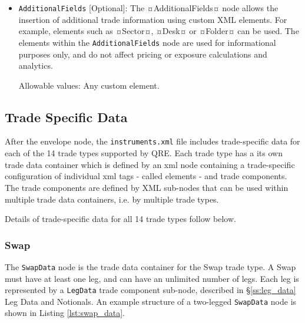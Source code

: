 \begin{itemize}

\item \lstinline!AdditionalFields! [Optional]: The ¤AdditionalFields¤ node allows the insertion of additional trade information using custom XML elements.  For example, elements such as ¤Sector¤, ¤Desk¤ or ¤Folder¤ can be used. The elements within the \lstinline!AdditionalFields! node are used for informational purposes only, and do not affect pricing or exposure calculations and analytics.

Allowable values: Any custom element.

\end{itemize}

\subsection{Trade Specific Data}

After the envelope node, the {\tt instruments.xml} file includes trade-specific data for each of the 14 trade types supported by QRE. Each trade type has a its own trade data container which is defined by an xml node containing a trade-specific configuration of individual xml tags - called elements - and trade components. The  trade components are defined by XML sub-nodes that can be used within multiple trade data containers, i.e.  by multiple trade types.

\vspace{1em}

Details of  trade-specific data for all 14 trade types follow below.

\subsubsection{Swap}

The \lstinline!SwapData! node is the trade data container for the Swap trade type. A Swap must have at least one leg, and can have an unlimited number of legs. Each leg is represented by a \lstinline!LegData! trade component sub-node, described in \S \ref{ss:leg_data} Leg Data and Notionals. An example structure of a two-legged \lstinline!SwapData! node  is shown in Listing \ref{lst:swap_data}.

